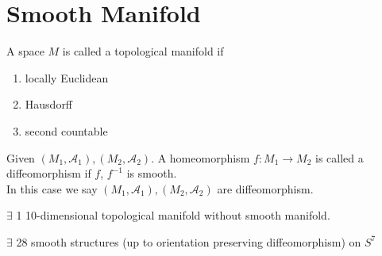 \section{Smooth Manifold}
\begin{definition}
    A space  $ M  $ is called a topological manifold if 
    \begin{enumerate}
        \item locally Euclidean
        \item Hausdorff
        \item second countable
    \end{enumerate}
\end{definition}
\begin{definition}
    Given  $ (M_1,\mathcal{A}_1),(M_2,\mathcal{A}_2) $. A homeomorphism  $ f:M_1\rightarrow M_2 $ is called a diffeomorphism if   $ f $, $ f^{-1} $  is smooth. \\
    In this case we say  $ (M_1,\mathcal{A}_1),(M_2,\mathcal{A}_2) $ are diffeomorphism. 
\end{definition}
\begin{theorem}[Kervaire]
     $ \exists  $ 1 10-dimensional topological manifold without smooth manifold.
\end{theorem}
\begin{theorem}
     $ \exists  $ 28 smooth structures (up to orientation preserving diffeomorphism) on  $ S^7 $ 
\end{theorem}
